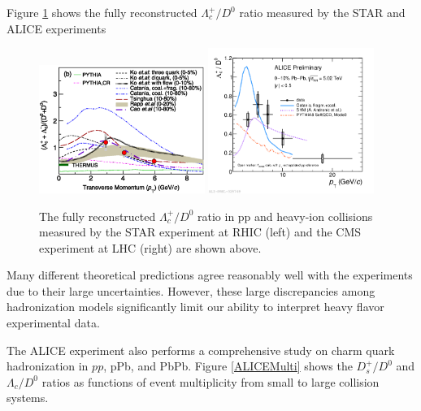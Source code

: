 Figure \ref{HadroPlotCharm} shows the fully reconstructed $\Lambda_c^+/D^0$ ratio measured by the STAR and ALICE experiments



\begin{figure}[hbtp]
\begin{center}
\includegraphics[width=0.48\textwidth]{Figures/Chapter2/STARLambdaCD0.png}
\includegraphics[width=0.48\textwidth]{Figures/Chapter2/ALICELambdaCD0}
\caption{The fully reconstructed $\Lambda_c^+/D^0$ ratio in pp and heavy-ion collisions measured by the STAR experiment at RHIC (left) and the CMS experiment at LHC (right) are shown above.}
\label{HadroPlotCharm}
\end{center}
\end{figure}   



Many different theoretical predictions agree reasonably well with the experiments due to their large uncertainties. However, these large discrepancies among hadronization models significantly limit our ability to interpret heavy flavor experimental data. 

The ALICE experiment also performs a comprehensive study on charm quark hadronization in $pp$, pPb, and PbPb. Figure \ref{ALICEMulti} shows the $D^+_s/D^0$ and $\Lambda_c/D^0$  ratios as functions of event multiplicity from small to large collision systems. 

